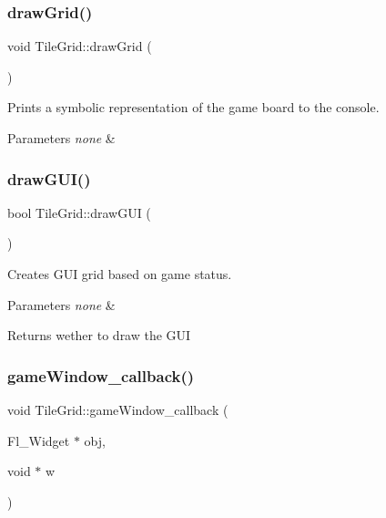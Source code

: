 \subsubsection{\texorpdfstring{draw\+Grid()}{drawGrid()}}
{\footnotesize\ttfamily void Tile\+Grid\+::draw\+Grid (\begin{DoxyParamCaption}{ }\end{DoxyParamCaption})}

Prints a symbolic representation of the game board to the console.


\begin{DoxyParams}{Parameters}
{\em none} & \\
\hline
\end{DoxyParams}
\mbox{\label{classTileGrid_a787046588114e5a17a2869113e53b35d}} 
\subsubsection{\texorpdfstring{draw\+G\+U\+I()}{drawGUI()}}
{\footnotesize\ttfamily bool Tile\+Grid\+::draw\+G\+UI (\begin{DoxyParamCaption}{ }\end{DoxyParamCaption})}

Creates G\+UI grid based on game status.


\begin{DoxyParams}{Parameters}
{\em none} & \\
\hline
\end{DoxyParams}
\begin{DoxyReturn}{Returns}
wether to draw the G\+UI 
\end{DoxyReturn}
\mbox{\label{classTileGrid_a7c598f748da8a08d0bf2ef1d35d50fea}} 
\subsubsection{\texorpdfstring{game\+Window\+\_\+callback()}{gameWindow\_callback()}}
{\footnotesize\ttfamily void Tile\+Grid\+::game\+Window\+\_\+callback (\begin{DoxyParamCaption}\item[{Fl\+\_\+\+Widget $\ast$}]{obj,  }\item[{void $\ast$}]{w }\end{DoxyParamCaption})\hspace{0.3cm}{\ttfamily [static]}}

